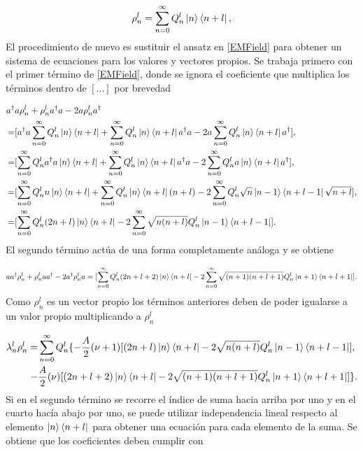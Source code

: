 \documentclass[a4paper,10pt]{report}
\begin{document}
\begin{equation}
 \rho^l_n = \sum_{n=0}^\infty Q_n^l\Ket{n}\Bra{n+l},
\end{equation} El procedimiento de nuevo es sustituir el ansatz en \eqref{EMField} para obtener un sistema de ecuaciones para los valores y vectores propios. Se trabaja primero con el primer término de \eqref{EMField}, donde se ignora el coeficiente que multiplica los términos dentro de $[...]$ por brevedad

\begin{align*}
a^\dagger& a\rho^l_n + \rho^l_n a^\dagger a -2a\rho^l_n a^\dagger\\
=&[a^\dagger a\sum_{n=0}^\infty Q_n^l\Ket{n}\Bra{n+l} + \sum_{n=0}^\infty Q_n^l\Ket{n}\Bra{n+l} a^\dagger a -2a\sum_{n=0}^\infty Q_n^l\Ket{n}\Bra{n+l} a^\dagger],\\
=&[\sum_{n=0}^\infty Q_n^la^\dagger a\Ket{n}\Bra{n+l} + \sum_{n=0}^\infty Q_n^l\Ket{n}\Bra{n+l} a^\dagger a -2\sum_{n=0}^\infty Q_n^la\Ket{n}\Bra{n+l} a^\dagger],\\
=&[\sum_{n=0}^\infty Q_n^ln\Ket{n}\Bra{n+l} + \sum_{n=0}^\infty Q_n^l\Ket{n}\Bra{n+l} (n+l) -2\sum_{n=0}^\infty Q_n^l\sqrt{n}\Ket{n-1}\Bra{n+l-1}\sqrt{n+l}],\\
=&[\sum_{n=0}^\infty Q_n^l(2n+l)\Ket{n}\Bra{n+l} -2\sum_{n=0}^\infty\sqrt{n(n+l)} Q_n^l\Ket{n-1}\Bra{n+l-1}].\\
\end{align*} El segundo término actúa de una forma completamente análoga y se obtiene

\begin{equation}
aa^\dagger\rho^l_n + \rho^l_n  aa^\dagger -2a^\dagger\rho^l_n a=[\sum_{n=0}^\infty Q_n^l(2n+l+2)\Ket{n}\Bra{n+l} -2\sum_{n=0}^\infty\sqrt{(n+1)(n+l+1)} Q_n^l\Ket{n+1}\Bra{n+l+1}].
\end{equation} Como $\rho^l_n$  es un vector propio los términos anteriores deben de poder igualarse a un valor propio multiplicando a $\rho^l_n$

\begin{align}
\lambda_n^l \rho_n^l=& \sum_{n=0}^\infty Q_n^l \{ -\frac{A}{2}(\nu+1)[(2n+l)\Ket{n}\Bra{n+l} -2\sqrt{n(n+l)} Q_n^l\Ket{n-1}\Bra{n+l-1}] \nonumber, \\
-&\frac{A}{2}(\nu)[(2n+l+2)\Ket{n}\Bra{n+l}-2\sqrt{(n+1)(n+l+1)} Q_n^l\Ket{n+1}\Bra{n+l+1}]\}.
\end{align} Si en el segundo término se recorre el índice de suma hacia arriba por uno y en el cuarto hacía abajo por uno, se puede utilizar independencia lineal respecto al elemento $\Ket{n}\Bra{n+l}$ para obtener una ecuación para cada elemento de la suma. Se obtiene que los coeficientes deben cumplir con
\end{document}
